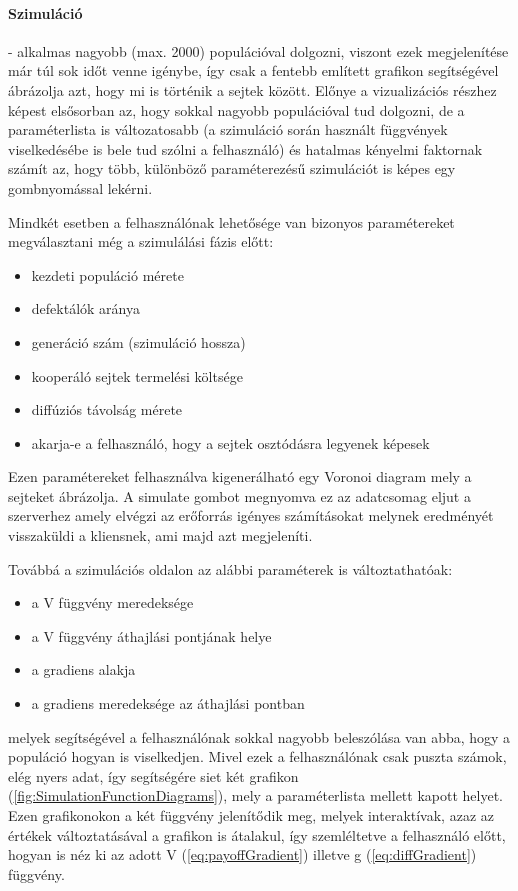 \paragraph{Szimuláció}- alkalmas nagyobb (max. 2000) populációval dolgozni, viszont ezek megjelenítése már túl sok időt venne igénybe, így csak a fentebb említett grafikon segítségével ábrázolja azt, hogy mi is történik a sejtek között. Előnye a vizualizációs részhez képest elsősorban az, hogy sokkal nagyobb populációval tud dolgozni, de a paraméterlista is változatosabb (a szimuláció során használt függvények viselkedésébe is bele tud szólni a felhasználó) és hatalmas kényelmi faktornak számít az, hogy több, különböző paraméterezésű szimulációt is képes egy gombnyomással lekérni.

Mindkét esetben a felhasználónak lehetősége van bizonyos paramétereket megválasztani még a szimulálási fázis előtt:
\begin{itemize}[noitemsep]
	\item kezdeti populáció mérete
	\item defektálók aránya 
	\item generáció szám (szimuláció hossza)
	\item kooperáló sejtek termelési költsége 
	\item diffúziós távolság mérete
	\item akarja-e a felhasználó, hogy a sejtek osztódásra legyenek képesek
\end{itemize}
Ezen paramétereket felhasználva kigenerálható egy Voronoi diagram mely a sejteket ábrázolja. A simulate gombot megnyomva ez az adatcsomag eljut a szerverhez amely elvégzi az erőforrás igényes számításokat melynek eredményét visszaküldi a kliensnek, ami majd azt megjeleníti.

Továbbá a szimulációs oldalon az alábbi paraméterek is változtathatóak:
\begin{itemize}[noitemsep]
	\item a V függvény meredeksége
	\item a V függvény áthajlási pontjának helye
	\item a gradiens alakja
	\item a gradiens meredeksége az áthajlási pontban
\end{itemize}
melyek segítségével a felhasználónak sokkal nagyobb beleszólása van abba, hogy a populáció hogyan is viselkedjen. Mivel ezek a felhasználónak csak puszta számok, elég nyers adat, így segítségére siet két grafikon (\ref{fig:SimulationFunctionDiagrams}), mely a paraméterlista mellett kapott helyet. Ezen grafikonokon a két függvény jelenítődik meg, melyek interaktívak, azaz az értékek változtatásával a grafikon is átalakul, így szemléltetve a felhasználó előtt, hogyan is néz ki az adott V (\ref{eq:payoffGradient}) illetve g (\ref{eq:diffGradient}) függvény.

